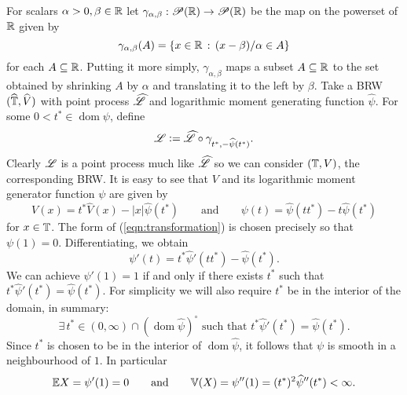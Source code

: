 For scalars $\alpha > 0, \beta \in \mathbb{R}$ let $\gamma_{\alpha, \beta} : \mathscr{P}(\mathbb{R}) \to \mathscr{P}(\mathbb{R})$ be the map on the powerset of $\mathbb{R}$ given by
\begin{equation}\nonumber
\gamma_{\alpha, \beta}(A) = \{x \in \mathbb{R}\,:\, (x - \beta) / \alpha \in A\}
\end{equation}
for each $A \subseteq \mathbb{R}$. Putting it more simply, $\gamma_{\alpha, \beta}$ maps a subset $A \subseteq \mathbb{R}$ to the set obtained by shrinking $A$ by $\alpha$ and translating it to the left by $\beta$. Take a BRW $(\mathbb{\widehat{T}}, \widehat{V})$ with point process $\widehat{\mathscr{L}}$ and logarithmic moment generating function $\widehat{\psi}$. For some $0 < t^* \in \operatorname*{dom} \psi$, define
\begin{equation}\label{eqn:transformation}
\mathscr{L} \vcentcolon= \widehat{\mathscr{L}} \circ \gamma_{t^* , - \widehat{\psi}(t^*)}. 
\end{equation}
Clearly $\mathscr{L}$ is a point process much like $\widehat{\mathscr{L}}$ so we can consider $(\mathbb{T}, V)$, the corresponding BRW. It is easy to see that $V$ and its logarithmic moment generator function $\psi$ are given by 
\begin{equation}\label{eqn:transformation2}
V(x) = t^* \widehat{V}(x) - |x| \widehat{\psi}(t^*) \qquad\text{and}\qquad \psi(t) = \widehat{\psi}(t t^*) -t \widehat{\psi}(t^*) 
\end{equation}
for $x \in \mathbb{T}$. The form of (\ref{eqn:transformation}) is chosen precisely so that $\psi(1) = 0$. Differentiating, we obtain
\begin{equation}\nonumber
\psi'(t) = t^* \widehat{\psi}'(t t^*) - \widehat{\psi} (t^*). 
\end{equation}
We can achieve $\psi'(1) = 1$ if and only if there exists $t^*$ such that $t^* \widehat{\psi}'(t^*) = \widehat{\psi} (t^*)$. For simplicity we will also require $t^*$ be in the interior of the domain, in summary:
\begin{equation}\label{eqn:t*exists}
\exists\,t^* \in (0, \infty) \cap (\operatorname*{dom}\widehat{\psi})^\circ\text{ such that } t^* \widehat{\psi}'(t^*) = \widehat{\psi} (t^*). 
\end{equation}
Since $t^*$ is chosen to be in the interior of $\operatorname*{dom}\widehat{\psi}$, it follows that $\psi$ is smooth in a neighbourhood of $1$. In particular
\begin{equation}\nonumber
\mathbb{E}{X} = \psi'(1) = 0 \qquad\text{and}\qquad \mathbb{V}(X) = \psi''(1) = (t^*)^2 \widehat{\psi}''(t^*) < \infty. 
\end{equation} 
